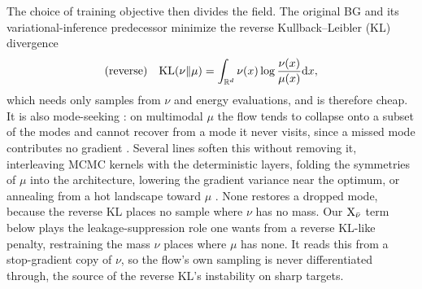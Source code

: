 \documentclass{article}
\begin{document}
The choice of training objective then divides the field. The original BG \citep{noe2019boltzmann} and its variational-inference predecessor \citep{rezende2015variational} minimize the reverse Kullback--Leibler (KL) divergence
\begin{equation}
    \text{(reverse)}\quad \mathrm{KL}(\nu\|\mu) = \int_{\mathbb R^d} \nu(x) \log \frac{\nu(x)}{\mu(x)} \mathrm{d} x,
    \label{eq: reverse KL}
\end{equation}
which needs only samples from $\nu$ and energy evaluations, and is therefore cheap. It is also mode-seeking \citep{wainwright2008graphical}: on multimodal $\mu$ the flow tends to collapse onto a subset of the modes and cannot recover from a mode it never visits, since a missed mode contributes no gradient \citep{wu2020stochastic,felardos2023designing}. Several lines soften this without removing it, interleaving MCMC kernels with the deterministic layers, folding the symmetries of $\mu$ into the architecture, lowering the gradient variance near the optimum, or annealing from a hot landscape toward $\mu$ \citep{wu2020stochastic,kohler2020equivariant,vaitl2022gradients,schopmans2025temperature}. None restores a dropped mode, because the reverse KL places no sample where $\nu$ has no mass. Our $\mathrm{X}_{\bar\nu}$ term below plays the leakage-suppression role one wants from a reverse KL-like penalty, restraining the mass $\nu$ places where $\mu$ has none. It reads this from a stop-gradient copy of $\nu$, so the flow's own sampling is never differentiated through, the source of the reverse KL's instability on sharp targets.
\end{document}
